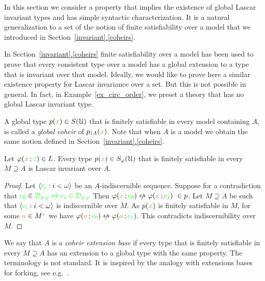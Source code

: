 \documentclass[creche.tex]{subfiles}
\begin{document}
In this section we consider a property that implies the existence of global Lascar invariant types and has simple syntactic characterization.
It is a natural generalization to a set of the notion of finite satisfiability over a model that we introduced in Section~\hyperref[coheirs]{\ref*{invariant}.\ref*{coheirs}}.

In Section~\hyperref[coheirs]{\ref*{invariant}.\ref*{coheirs}} finite satisfiability over a model has been used to prove that every consistent type over a model has a global extension to a type that is invariant over that model. 
Ideally, we would like to prove here a similar existence property for Lascar invariance over a set.
But this is not possible in general.
In fact, in Example~\ref{ex_circ_order}, we preset a theory that has no global Lascar invariant type.


A global type $p({\color{brown} x})\in S(\EuScript U)$ that is finitely satisfiable in every model containing $A$, is called a \emph{global coheir\/} of $p_{\restriction A}({\color{brown} x})$. 
Note that when $A$ is a model we obtain the same notion defined in Section~\hyperref[coheirs]{\ref*{invariant}.\ref*{coheirs}}.

\begin{proposition} 
  Let $\varphi({\color{brown} x}\,;{\color{green} z})\in L$.
  Every type $p({\color{brown} x})\in S_\varphi(\EuScript U)$ that is finitely satisfiable in every $M\supseteq A$ is Lascar invariant over $A$.
\end{proposition}

\begin{proof}
  Let $\langle{\color{green}c_i}:i<\omega\rangle$ be an $A\mbox{-}$indiscernible sequence.
  Suppose for a contradiction that ${\gr c_0}\in\gr\D_{p,\phi}\niff{\gr c_1}\in\gr\D_{p,\phi}$
  Then $\phi({\mr x}\,;{\gr c_0})\niff\phi({\mr x}\,;{\gr c_1})\ \in p$.
  Let $M\supseteq A$ be such that $\langle{\color{green}c_i}:i<\omega\rangle$ is indiscernible over $M$.
  As $p({\color{brown} x})$ is finitely satisfiable in $M$, for some ${\color{brown} a}\in M^{\color{brown} x}$ we have $\phi({\mr a}\,;{\gr c_0})\niff\phi({\mr a}\,;{\gr c_1})$.
  This contradicts indiscernibility over $M$.
\end{proof}

\noindent\llap{\textcolor{red}{\Large\danger}\kern1.5ex}
We say that $A$ is a \emph{coheir extension base\/} if every type that is finitely satisfiable in every $M\supseteq A$ has an extension to a global type with the same property.
The terminology is not standard.
It is inspired by the analogy with extensions bases for forking, see e.g.~\cite{Simon}.  
\end{document}
